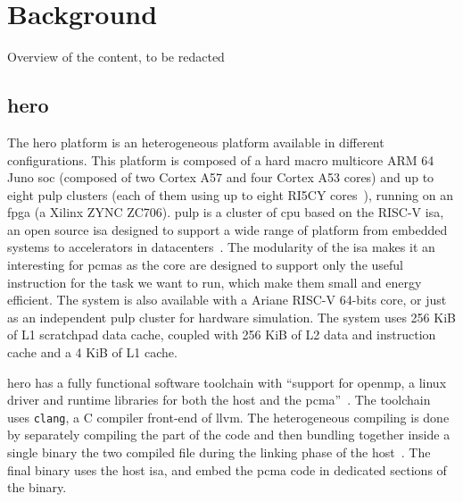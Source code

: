 
\chapter{Background}
		Overview of the content, to be redacted
\section{\acrshort{hero}}
	The \gls{hero} platform is an heterogeneous platform available in different configurations. 
	This platform is composed of a hard macro multicore ARM 64 Juno \gls{soc} (composed of two Cortex A57 and four Cortex A53 cores) and up to eight \gls{pulp} clusters (each of them using up to eight RI5CY cores~\cite{Art:Hero}), running on an \gls{fpga} (a Xilinx ZYNC ZC706).
	\Gls{pulp} is a cluster of \gls{cpu} based on the RISC-V \gls{isa}, an open source \gls{isa} designed to support a wide range of platform from embedded systems to accelerators in datacenters~\cite{Web:EPIriscv}.
	The modularity of the \gls{isa} makes it an interesting for \glspl{pcma} as the core are designed to support only the useful instruction for the task we want to run, which make them small and energy efficient.
	The system is also available with a Ariane RISC-V 64-bits core, or just as an independent \gls{pulp} cluster for hardware simulation.
	The system uses 256 \si{KiB} of L1 scratchpad data cache, coupled with 256 \si{KiB} of L2 data and instruction cache and a 4 \si{KiB} of L1 cache.


	\Gls{hero} has a fully functional software toolchain with ``support for \gls{openmp}, a linux driver and runtime libraries for both the host and the \gls{pcma}''~\cite{Art:Hero}. The toolchain uses \texttt{clang}, a C compiler front-end of \gls{llvm}.
	The heterogeneous compiling is done by separately compiling the part of the code and then bundling together inside a single binary the two compiled file during the linking phase of the host~\cite{Report:SoftwareStack}. The final binary uses the host \gls{isa}, and embed the \gls{pcma} code in dedicated sections of the binary.





